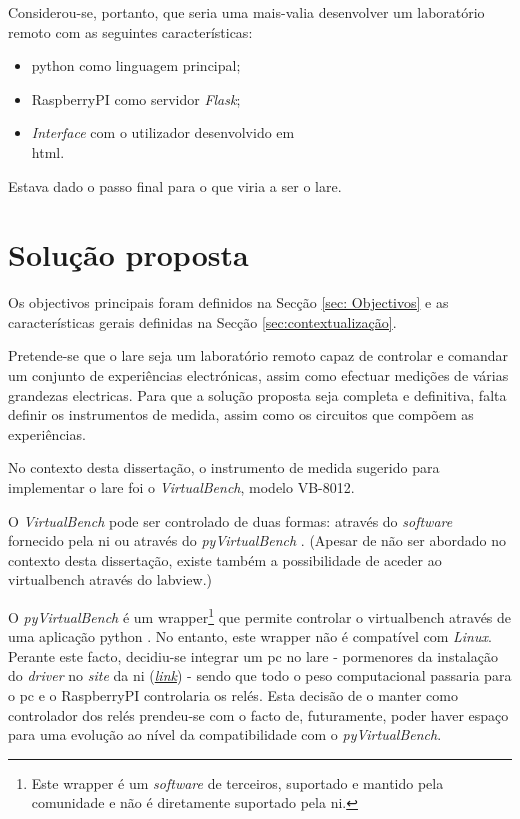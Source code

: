 Considerou-se, portanto, que seria uma mais-valia desenvolver um \acrshort{laboratório remoto} com as seguintes características:
\begin{itemize}
    \item \gls{python} como linguagem principal;
    \item \gls{RaspberryPI} como servidor \textit{Flask};
    \item \textit{Interface} com o utilizador desenvolvido em \\
          \acrfull{html}.
\end{itemize}

Estava dado o passo final para o que viria a ser o \acrshort{lare}.

\section{Solução proposta}
\label{sec:solucaoproposta}
Os objectivos principais foram definidos na Secção \ref{sec: Objectivos} e as características gerais definidas na Secção \ref{sec:contextualização}.

Pretende-se que o \acrshort{lare} seja um \acrshort{laboratório remoto} capaz de controlar e comandar um conjunto de experiências electrónicas, assim como efectuar medições de várias grandezas electricas. Para que a solução proposta seja completa e definitiva, falta definir os instrumentos de medida, assim como os circuitos que compõem as experiências.

No contexto desta dissertação, o instrumento de medida sugerido para implementar o \acrshort{lare} foi o \textit{VirtualBench}, modelo VB-8012.

O \textit{VirtualBench} pode ser controlado de duas formas: através do \textit{software} fornecido pela \acrshort{ni} ou através do \textit{pyVirtualBench} \cite{AutomatingVB}. (Apesar de não ser abordado no contexto desta dissertação, existe também a possibilidade de aceder ao \acrshort{virtualbench} através do \acrshort{labview}.)

O \textit{pyVirtualBench} é um \gls{wrapper}\footnote{Este \gls{wrapper} é um \textit{software} de terceiros, suportado e mantido pela comunidade e não é diretamente suportado pela \acrshort{ni}.} que permite controlar o \acrshort{virtualbench} através de uma aplicação \gls{python} \cite{pyvirtualbench}. No entanto, este \gls{wrapper} não é compatível com \textit{Linux}.
Perante este facto, decidiu-se integrar um \acrshort{pc} no \acrshort{lare} - pormenores da instalação do \textit{driver} no \textit{site} da \acrshort{ni} (\href{https://knowledge.ni.com/KnowledgeArticleDetails?id=kA00Z000000kHUFSA2&l=pt-PT}{\textit{link}}) - sendo que todo o peso computacional passaria para o \acrshort{pc} e o \gls{RaspberryPI} controlaria os relés. Esta decisão de o manter como controlador dos relés prendeu-se com o facto de, futuramente, poder haver espaço para uma evolução ao nível da compatibilidade com o \textit{pyVirtualBench}.

